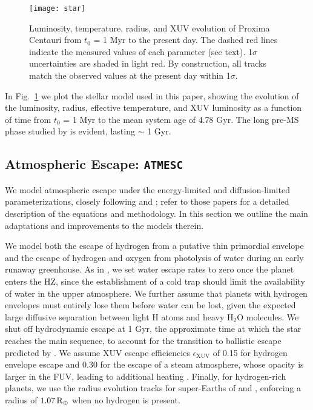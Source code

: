 \documentclass[preprint,12pt]{aastex}
\def\rearth{{\rm\,R_\oplus}}
\def\atmesc{\texttt{\footnotesize{ATMESC}}\xspace}
\begin{document}
\begin{figure}[ht]
\centering
\texttt{[image: star]}
\caption{Luminosity, temperature, radius, and XUV evolution of Proxima
  Centauri from $t_0$ = 1 Myr to the present day. The dashed red lines
  indicate the measured values of each parameter (see text). 1$\sigma$
  uncertainties are shaded in light red. By construction, all tracks
  match the observed values at the present day within 1$\sigma$.}
\label{fig:stellar:evol}
\end{figure}

In Fig.~\ref{fig:stellar:evol} we plot the stellar model used in this
paper, showing the evolution of the luminosity, radius, effective
temperature, and XUV luminosity as a function of time from $t_0$ = 1
Myr to the mean system age of 4.78 Gyr. The long pre-MS phase studied
by \cite{LugerBarnes15} is evident, lasting $\sim$ 1 Gyr.

\subsection{Atmospheric Escape: \atmesc}
\label{sec:models:atmesc}

We model atmospheric escape under the energy-limited \citep{Watson81,Erkaev07} and
diffusion-limited \citep{Hunten73} parameterizations, closely following \cite{Luger15}
and \cite{LugerBarnes15}; refer to those papers for a detailed
description of the equations and methodology. In this section we
outline the main adaptations and improvements to the models therein.

We model both the escape of hydrogen from a putative thin primordial
envelope and the escape of hydrogen and oxygen from photolysis of
water during an early runaway greenhouse. As in \cite{LugerBarnes15},
we set water escape rates to zero once the planet enters the HZ, since
the establishment of a cold trap should limit the availability of
water in the upper atmosphere. We further assume that planets with
hydrogen envelopes must entirely lose them before water can be lost,
given the expected large diffusive separation between light H atoms
and heavy H$_2$O molecules.  We shut off hydrodynamic escape at 1 Gyr,
the approximate time at which the star reaches the main sequence, to
account for the transition to ballistic escape predicted by
\cite{OwenMohanty16}. We assume XUV escape efficiencies
$\epsilon_\mathrm{XUV}$ of 0.15 for hydrogen envelope escape and 0.30
for the escape of a steam atmosphere, whose opacity is larger in the
FUV, leading to additional heating \citep{Sekiya81}. Finally, for
hydrogen-rich planets, we use the radius evolution tracks for
super-Earths of \cite{Lopez12} and \cite{LopezFortney14}, enforcing a
radius of $1.07 \rearth$ when no hydrogen is present.
\end{document}
